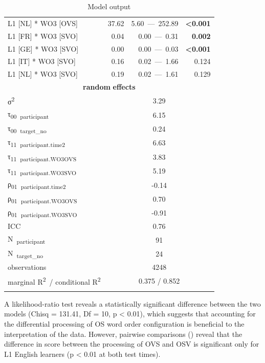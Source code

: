 \begin{table}
\begin{tabularx}{\textwidth}{Xrrr}
    L1 [NL] * WO3 [OVS] & 37.62 & 5.60~—~252.89 & \textbf{<0.001}\\
    L1 [FR] * WO3 [SVO] & 0.04 & 0.00~—~0.31 & \textbf{0.002}\\
    L1 [GE] * WO3 [SVO] & 0.00 & 0.00~—~0.03 & \textbf{<0.001}\\
    L1 [IT] * WO3 [SVO] & 0.16 & 0.02~—~1.66 & 0.124\\
    L1 [NL] * WO3 [SVO] & 0.19 & 0.02~—~1.61 & 0.129\\
    \multicolumn{4}{c}{\textbf{random} \textbf{effects}}\\
    σ\textsuperscript{2} & \multicolumn{3}{c}{3.29}\\
    τ\textsubscript{00}~\textsubscript{participant} & \multicolumn{3}{c}{6.15}\\
    τ\textsubscript{00}~\textsubscript{target\_no} & \multicolumn{3}{c}{0.24}\\
    τ\textsubscript{11}~\textsubscript{participant.time2} & \multicolumn{3}{c}{6.63}\\
    τ\textsubscript{11}~\textsubscript{participant.WO3OVS} & \multicolumn{3}{c}{3.83}\\
    τ\textsubscript{11}~\textsubscript{participant.WO3SVO} & \multicolumn{3}{c}{5.19}\\
    ρ\textsubscript{01}~\textsubscript{participant.time2} & \multicolumn{3}{c}{{}-0.14}\\
    ρ\textsubscript{01}~\textsubscript{participant.WO3OVS} & \multicolumn{3}{c}{0.70}\\
    ρ\textsubscript{01}~\textsubscript{participant.WO3SVO} & \multicolumn{3}{c}{{}-0.91}\\
    ICC & \multicolumn{3}{c}{0.76}\\
    N~\textsubscript{participant} & \multicolumn{3}{c}{91}\\
    N~\textsubscript{target\_no} & \multicolumn{3}{c}{24}\\
    observations & \multicolumn{3}{c}{4248}\\
    marginal R\textsuperscript{2}~/ conditional R\textsuperscript{2} & \multicolumn{3}{c}{0.375 / 0.852}\\
    \lspbottomrule
    \end{tabularx}
    \caption{Model output}
    \label{tab:05:9}
\end{table}

A likelihood-ratio test reveals a statistically significant difference between the two models (Chisq = 131.41, Df = 10, p < 0.01), which suggests that accounting for the differential processing of OS word order configuration is beneficial to the interpretation of the data. However, pairwise comparisons () reveal that the difference in score between the processing of OVS and OSV is significant only for L1 English learners (p < 0.01 at both test times).

